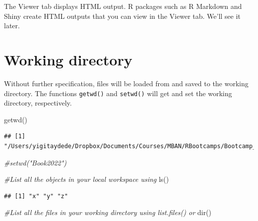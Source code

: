 \documentclass[
]{book}
\newenvironment{Shaded}{\begin{snugshade}}{\end{snugshade}}
\newcommand{\CommentTok}[1]{\textcolor[rgb]{0.56,0.35,0.01}{\textit{#1}}}
\newcommand{\FunctionTok}[1]{\textcolor[rgb]{0.00,0.00,0.00}{#1}}
\newcommand{\NormalTok}[1]{#1}
\begin{document}
The Viewer tab displays HTML output. R packages such as R Markdown and Shiny create HTML outputs that you can view in the Viewer tab. We'll see it later.

\hypertarget{working-directory}{%
\section{Working directory}\label{working-directory}}

Without further specification, files will be loaded from and saved to the working directory. The functions \texttt{getwd()} and \texttt{setwd()} will get and set the working directory, respectively.

\begin{Shaded}
\begin{Highlighting}[]
\FunctionTok{getwd}\NormalTok{()}
\end{Highlighting}
\end{Shaded}

\begin{verbatim}
## [1] "/Users/yigitaydede/Dropbox/Documents/Courses/MBAN/RBootcamps/Bootcamp_book"
\end{verbatim}

\begin{Shaded}
\begin{Highlighting}[]
\CommentTok{\#setwd("Book2022")}

\CommentTok{\#List all the objects in your local workspace using}
\FunctionTok{ls}\NormalTok{()}
\end{Highlighting}
\end{Shaded}

\begin{verbatim}
## [1] "x" "y" "z"
\end{verbatim}

\begin{Shaded}
\begin{Highlighting}[]
\CommentTok{\#List all the files in your working directory using list.files() or }
\FunctionTok{dir}\NormalTok{()}
\end{Highlighting}
\end{Shaded}
\end{document}
